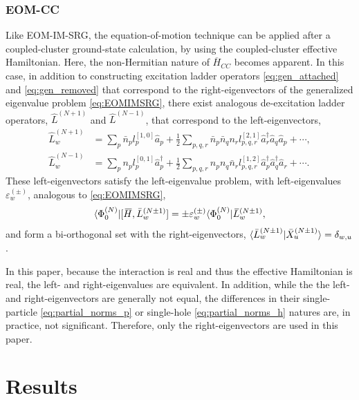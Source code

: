 \subsubsection{EOM-CC}
\label{subsec:eomcc}
Like EOM-IM-SRG, the equation-of-motion technique can be applied after a coupled-cluster ground-state calculation, by using the coupled-cluster effective Hamiltonian.  Here, the non-Hermitian nature of $\overbar{H}_{CC}$ becomes apparent.  In this case, in addition to constructing excitation ladder operators \eqref{eq:gen_attached} and \eqref{eq:gen_removed} that correspond to the right-eigenvectors of the generalized eigenvalue problem \eqref{eq:EOMIMSRG}, there exist analogous de-excitation ladder operators, $\hat{L}^{(N+1)}$ and $\hat{L}^{(N-1)}$, that correspond to the left-eigenvectors,
\begin{align}
  \label{eq:left_attached}
    \hat{L}^{(N+1)}_w &= \sum_p \bar{n}_p l^{[1,0]}_p  \hat{a}_p + \frac{1}{2} \sum_{p, q, r} \bar{n}_p \bar{n}_q n_r l^{[2,1]}_{p, q, r} \hat{a}^\dagger_r \hat{a}_q \hat{a}_p + \cdots,  \\
  \label{eq:left_removed}
    \hat{L}^{(N-1)}_w &= \sum_p n_p l_p^{[0,1]} \hat{a}^\dagger_p + \frac{1}{2} \sum_{p, q, r} n_p n_q \bar{n}_r  l^{[1,2]}_{p, q, r} \hat{a}^\dagger_p  \hat{a}^\dagger_q \hat{a}_r + \cdots.
\end{align}
These left-eigenvectors satisfy the left-eigenvalue problem, with left-eigenvalues $\varepsilon^{(\pm)}_w$, analogous to \eqref{eq:EOMIMSRG},
\begin{equation}\label{eq:left_EOM}
  \bra{\Phi^{(N)}_0} [\overbar{H},\bar{L}^{(N \pm 1)}_w] = \pm \varepsilon^{(\pm)}_w \bra{\Phi^{(N)}_0} \overbar{L}^{(N \pm 1)}_w,
\end{equation}
and form a bi-orthogonal set with the right-eigenvectors, $\langle \bar{L}^{(N \pm 1)}_w | \bar{X}^{(N \pm 1)}_u\rangle = \delta_{w,u}$.

In this paper, because the interaction is real and thus the effective Hamiltonian is real, the left- and right-eigenvalues are equivalent. In addition, while the the left- and right-eigenvectors are generally not equal, the differences in their single-particle \eqref{eq:partial_norms_p} or single-hole \eqref{eq:partial_norms_h} natures are, in practice, not significant.  Therefore, only the right-eigenvectors are used in this paper.

\section{Results}
\label{sec:results}

